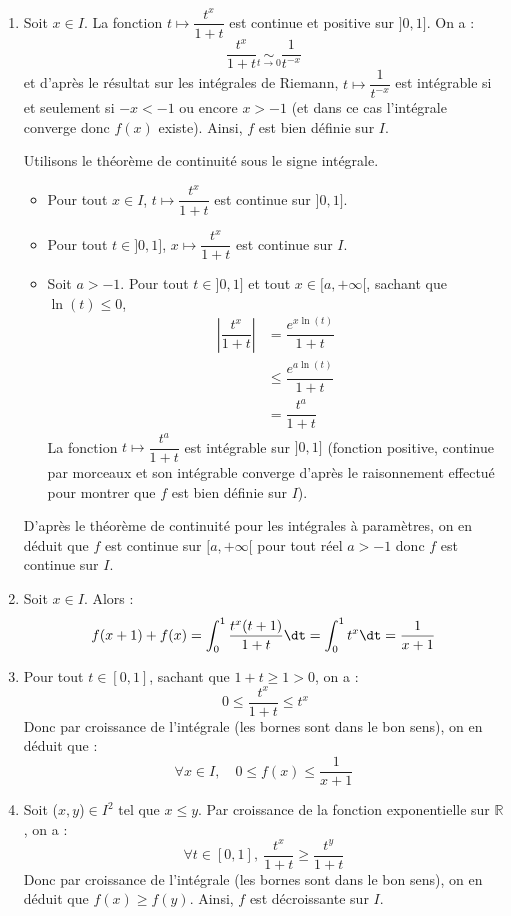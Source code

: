 \documentclass[a4paper,10pt]{report}
\begin{document}
	\begin{enumerate}
	\item Soit $x \in I$. La fonction $t\mapsto\dfrac{t^x}{1+t}$ est continue et positive sur $]0,1]$. On a :
	$$ \frac{t^{x}}{1+t} \underset{t \rightarrow 0}{\sim} \frac1{t^{-x}}$$
	et d'après le résultat sur les intégrales de Riemann, $t \mapsto \dfrac{1}{t^{-x}}$ est intégrable si et seulement si $-x<-1$ ou encore $x>-1$ (et dans ce cas l'intégrale converge donc $f(x)$ existe). Ainsi, $f$ est bien d\'efinie sur $I$.
	
	\medskip

\noindent Utilisons le théorème de continuité sous le signe intégrale.

\begin{itemize}
\item Pour tout $x \in I$, $t \mapsto \dfrac{t^x}{1+t}$ est continue sur $]0,1]$.
\item Pour tout $t \in ]0,1]$, $x \mapsto  \dfrac{t^x}{1+t}$ est continue sur $I$.
\item Soit $a>-1$. Pour tout $t \in ]0,1]$ et tout $x \in [a, + \infty[$, sachant que $\ln(t) \leq 0$,
\begin{align*}
 \left\vert \dfrac{t^x}{1+t} \right\vert & = \dfrac{e^{x \ln(t)}}{1+t} \\
 & \leq \dfrac{e^{a \ln(t)}}{1+t} \\
 & = \dfrac{t^a}{1+t}
 \end{align*}
La fonction $t \mapsto \dfrac{t^a}{1+t}$ est intégrable sur $]0,1]$ (fonction positive, continue par morceaux et son intégrable converge d'après le raisonnement effectué pour montrer que $f$ est bien définie sur $I$).
\end{itemize}
D'après le théorème de continuité pour les intégrales à paramètres, on en déduit que $f$ est continue sur $[a, + \infty[$ pour tout réel $a>-1$ donc $f$ est continue sur $I$.


	\item Soit $x \in I$.  Alors :
$$f(x+1)+f(x)=\int_0^1 \frac{t^x(t+1)}{1+t} \dt =\int_0^1t^x \dt=\frac1{x+1}$$

	\item Pour tout $t\in[0,1]$, sachant que $1+t \geq 1>0$, on a :
	$$ \ 0\le \frac{t^x}{1+t} \le t^x$$
Donc par croissance de l'intégrale (les bornes sont dans le bon sens), on en déduit que : 
$$ \forall x\in I,\quad 0\le f(x) \le \frac1{x+1}$$

	\item Soit ($x,y$)$\in I^2$ tel que $x\le y$. Par croissance de la fonction exponentielle sur $\mathbb{R}$, on a :
$$\forall t\in[0,1], \ \frac{t^x}{1+t} \ge \frac{t^y}{1+t}$$
Donc par croissance de l'intégrale (les bornes sont dans le bon sens), on en déduit que $f(x)\ge f(y)$. Ainsi, $f$ est d\'ecroissante sur $I$.


\end{enumerate}
\end{document}
